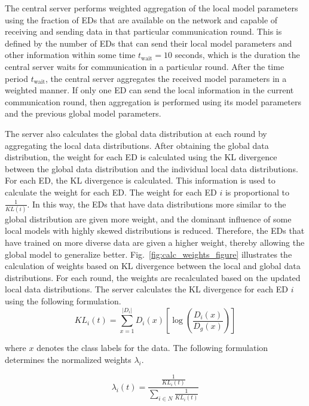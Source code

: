 \documentclass[journal]{IEEEtran}
\begin{document}
The central server performs weighted aggregation of the local model parameters using the fraction of EDs that are available on the network and capable of receiving and sending data in that particular communication round. This is defined by the number of EDs that can send their local model parameters and other information within some time $t_\text{wait}=10$ seconds, which is the duration the central server waits for communication in a particular round. After the time period $t_\text{wait}$, the central server aggregates the received model parameters in a weighted manner. If only one ED can send the local information in the current communication round, then aggregation is performed using its model parameters and the previous global model parameters. 

The server also calculates the global data distribution at each round by aggregating the local data distributions. After obtaining the global data distribution, the weight for each ED is calculated using the KL divergence between the global data distribution and the individual local data distributions. For each ED, the KL divergence is calculated. This information is used to calculate the weight for each ED. The weight for each ED $i$ is proportional to \(\frac{1}{KL(i)}\). In this way, the EDs that have data distributions more similar to the global distribution are given more weight, and the dominant influence of some local models with highly skewed distributions is reduced. Therefore, the EDs that have trained on more diverse data are given a higher weight, thereby allowing the global model to generalize better. Fig.~\ref{fig:calc_weights_figure} illustrates the calculation of weights based on KL divergence between the local and global data distributions. For each round, the weights are recalculated based on the updated local data distributions. The server calculates the KL divergence for each ED $i$ using the following formulation.
\begin{equation}
KL_i(t) = \sum_{x=1}^{|D_i|} D_i(x) \left[\log\left(\frac{D_i(x)}{D_g(x)}\right)\right]
\label{eq:kl_div}
\end{equation}

where $x$ denotes the class labels for the data. The following formulation determines the normalized weights \(\lambda_i\).

\begin{equation}
\lambda_i(t) = \frac{\frac{1}{KL_i(t)}}{\sum_{i \in N} \frac{1}{KL_i(t)}}
\label{eq:lambda1}
\end{equation}
\end{document}
